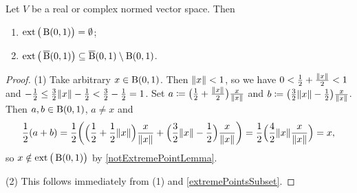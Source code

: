 \begin{lemma} \label{extremePointsUnitBall}
Let $V$ be a real or complex normed vector space. Then
\begin{enumerate}
\item $\operatorname{ext}\big(\operatorname{B}(0,1)\big) = \emptyset$;
\item $\operatorname{ext}\big(\operatorname{\overline{B}}(0,1)\big) \subseteq \operatorname{\overline{B}}(0,1)\setminus \operatorname{B}(0,1)$.
\end{enumerate}
\end{lemma}
\begin{proof}
(1) Take arbitrary $x\in \operatorname{B}(0,1)$. Then $\lVert x\rVert< 1$, so we have $0 < \frac{1}{2} + \frac{\lVert x\rVert}{2} < 1$ and $-\frac{1}{2} \leq \frac{3}{2}\lVert x\rVert - \frac{1}{2} < \frac{3}{2} - \frac{1}{2} = 1$. Set $a \coloneqq \big(\frac{1}{2} + \frac{\lVert x\rVert}{2}\big) \frac{x}{\lVert x\rVert}$ and $b \coloneqq \big(\frac{3}{2}\lVert x\rVert - \frac{1}{2}\big)\frac{x}{\lVert x\rVert}$. Then $a,b\in\operatorname{B}(0,1)$, $a\neq x$ and
\[ \frac{1}{2}(a+b) = \frac{1}{2}\bigg(\Big(\frac{1}{2} + \frac{1}{2}\lVert x\rVert\Big)\frac{x}{\lVert x\rVert} + \Big(\frac{3}{2}\lVert x\rVert - \frac{1}{2}\Big)\frac{x}{\lVert x\rVert}\bigg) = \frac{1}{2}\Big(\frac{4}{2}\lVert x\rVert\frac{x}{\lVert x\rVert}\Big) = x, \]
so $x\notin \operatorname{ext}\big(\operatorname{B}(0,1)\big)$ by \ref{notExtremePointLemma}.

(2) This follows immediately from (1) and \ref{extremePointsSubset}.
\end{proof}

